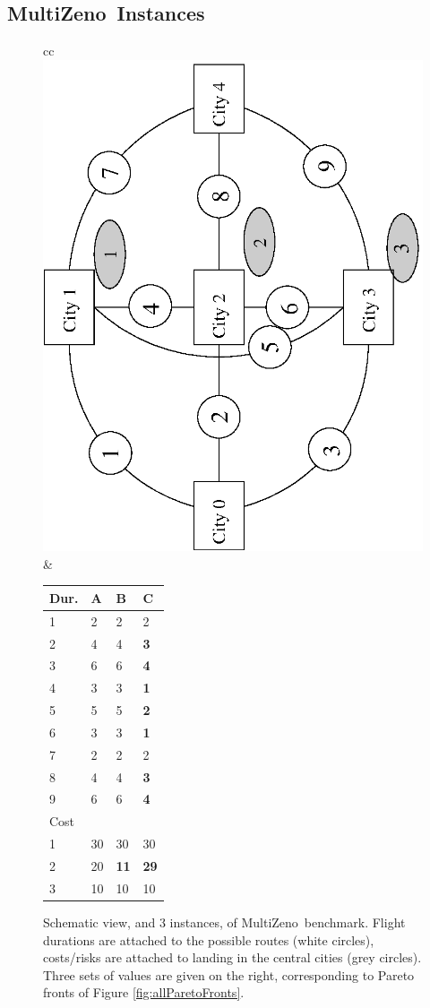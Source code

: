 \documentclass{article}
\def\MULTIZENO{{\sc MultiZeno}}
\begin{document}
\subsection{\MULTIZENO\ Instances}
\label{ZenoBenchmarks}
\begin{tiny}
\begin{figure}[tb]

\begin{tabular}{cc}
 \includegraphics[height=0.6\columnwidth,angle=270]{./generiqueMiniMulti.ps} 
& 
\begin{tiny}
\begin{tabular}[t]{|m{.25cm}||m{.15cm}|m{.15cm}|m{.15cm}|}
\hline
Dur. & A & B & C \\
\hline 
1 & 2 & 2 & 2\\
2 & 4 & 4 & {\bf 3}\\
3 & 6 & 6 & {\bf 4}\\
4 & 3 & 3 & {\bf 1}\\
5 & 5 & 5 & {\bf 2}\\
6 & 3 & 3 & {\bf 1}\\
7 & 2 & 2 & 2\\
8 & 4 & 4 & {\bf 3}\\
9 & 6 & 6 & {\bf 4}\\
\hline \hline
Cost & & & \\
\hline
1 &  30 & 30 & 30\\
2 & 20 & {\bf 11} &{\bf 29}\\
3 & 10 & 10 & 10 \\
\hline
\end{tabular}
\end{tiny}
\end{tabular}
\caption{Schematic view, and 3 instances, of \MULTIZENO\ benchmark. Flight durations are attached to the possible routes (white circles), costs/risks are attached to landing in the central cities (grey circles). Three sets of values are given on the right, corresponding to Pareto fronts of Figure \ref{fig:allParetoFronts}. }
\label{fig:instance}
\end{figure}
\end{tiny}
\end{document}
